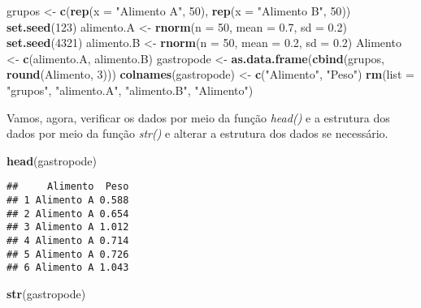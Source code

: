\documentclass[]{book}
\newenvironment{Shaded}{\begin{snugshade}}{\end{snugshade}}
\newcommand{\DataTypeTok}[1]{\textcolor[rgb]{0.13,0.29,0.53}{#1}}
\newcommand{\DecValTok}[1]{\textcolor[rgb]{0.00,0.00,0.81}{#1}}
\newcommand{\FloatTok}[1]{\textcolor[rgb]{0.00,0.00,0.81}{#1}}
\newcommand{\KeywordTok}[1]{\textcolor[rgb]{0.13,0.29,0.53}{\textbf{#1}}}
\newcommand{\NormalTok}[1]{#1}
\newcommand{\StringTok}[1]{\textcolor[rgb]{0.31,0.60,0.02}{#1}}
\begin{document}
\begin{Shaded}
\begin{Highlighting}[]
\NormalTok{grupos <-}\StringTok{ }\KeywordTok{c}\NormalTok{(}\KeywordTok{rep}\NormalTok{(}\DataTypeTok{x =} \StringTok{"Alimento A"}\NormalTok{, }\DecValTok{50}\NormalTok{), }\KeywordTok{rep}\NormalTok{(}\DataTypeTok{x =} \StringTok{"Alimento B"}\NormalTok{, }\DecValTok{50}\NormalTok{))}
\KeywordTok{set.seed}\NormalTok{(}\DecValTok{123}\NormalTok{)}
\NormalTok{alimento.A <-}\StringTok{ }\KeywordTok{rnorm}\NormalTok{(}\DataTypeTok{n =} \DecValTok{50}\NormalTok{, }\DataTypeTok{mean =} \FloatTok{0.7}\NormalTok{, }\DataTypeTok{sd =} \FloatTok{0.2}\NormalTok{)}
\KeywordTok{set.seed}\NormalTok{(}\DecValTok{4321}\NormalTok{)}
\NormalTok{alimento.B <-}\StringTok{ }\KeywordTok{rnorm}\NormalTok{(}\DataTypeTok{n =} \DecValTok{50}\NormalTok{, }\DataTypeTok{mean =} \FloatTok{0.2}\NormalTok{, }\DataTypeTok{sd =} \FloatTok{0.2}\NormalTok{)}
\NormalTok{Alimento <-}\StringTok{ }\KeywordTok{c}\NormalTok{(alimento.A, alimento.B)}
\NormalTok{gastropode <-}\StringTok{ }\KeywordTok{as.data.frame}\NormalTok{(}\KeywordTok{cbind}\NormalTok{(grupos, }\KeywordTok{round}\NormalTok{(Alimento, }\DecValTok{3}\NormalTok{)))}
\KeywordTok{colnames}\NormalTok{(gastropode) <-}\StringTok{ }\KeywordTok{c}\NormalTok{(}\StringTok{"Alimento"}\NormalTok{, }\StringTok{"Peso"}\NormalTok{)}
\KeywordTok{rm}\NormalTok{(}\DataTypeTok{list =} \StringTok{"grupos"}\NormalTok{, }\StringTok{"alimento.A"}\NormalTok{, }\StringTok{"alimento.B"}\NormalTok{, }\StringTok{"Alimento"}\NormalTok{)}
\end{Highlighting}
\end{Shaded}

Vamos, agora, verificar os dados por meio da função \emph{head()} e a estrutura dos dados por meio da função \emph{str()} e alterar a estrutura dos dados se necessário.

\begin{Shaded}
\begin{Highlighting}[]
\KeywordTok{head}\NormalTok{(gastropode)}
\end{Highlighting}
\end{Shaded}

\begin{verbatim}
##     Alimento  Peso
## 1 Alimento A 0.588
## 2 Alimento A 0.654
## 3 Alimento A 1.012
## 4 Alimento A 0.714
## 5 Alimento A 0.726
## 6 Alimento A 1.043
\end{verbatim}

\begin{Shaded}
\begin{Highlighting}[]
\KeywordTok{str}\NormalTok{(gastropode)}
\end{Highlighting}
\end{Shaded}
\end{document}
